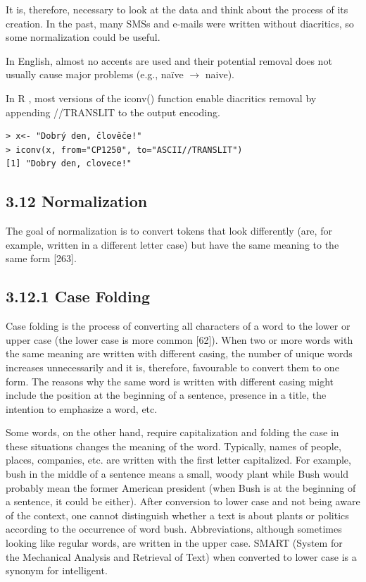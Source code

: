 \documentclass[10pt]{book}
\begin{document}
It is, therefore, necessary to look at the data and think about the process of its creation. In the past, many SMSs and e-mails were written without diacritics, so some normalization could be useful.

In English, almost no accents are used and their potential removal does not usually cause major problems (e.g., naïve $\rightarrow$ naive).

In R , most versions of the iconv() function enable diacritics removal by appending //TRANSLIT to the output encoding.

\begin{verbatim}
> x<- "Dobrý den, člověče!"
> iconv(x, from="CP1250", to="ASCII//TRANSLIT")
[1] "Dobry den, clovece!"
\end{verbatim}

\subsection*{3.12 Normalization}
The goal of normalization is to convert tokens that look differently (are, for example, written in a different letter case) but have the same meaning to the same form [263].

\subsection*{3.12.1 Case Folding}
Case folding is the process of converting all characters of a word to the lower or upper case (the lower case is more common [62]). When two or more words with the same meaning are written with different casing, the number of unique words increases unnecessarily and it is, therefore, favourable to convert them to one form. The reasons why the same word is written with different casing might include the position at the beginning of a sentence, presence in a title, the intention to emphasize a word, etc.

Some words, on the other hand, require capitalization and folding the case in these situations changes the meaning of the word. Typically, names of people, places, companies, etc. are written with the first letter capitalized. For example, bush in the middle of a sentence means a small, woody plant while Bush would probably mean the former American president (when Bush is at the beginning of a sentence, it could be either). After conversion to lower case and not being aware of the context, one cannot distinguish whether a text is about plants or politics according to the occurrence of word bush. Abbreviations, although sometimes looking like regular words, are written in the upper case. SMART (System for\\
the Mechanical Analysis and Retrieval of Text) when converted to lower case is a synonym for intelligent.
\end{document}
